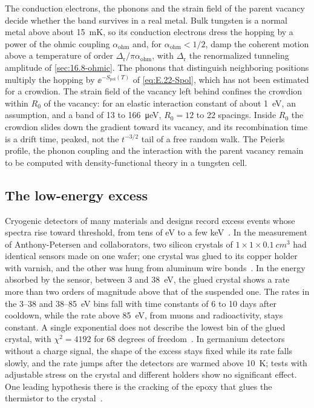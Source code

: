 The conduction electrons, the phonons and the strain field of the parent vacancy decide whether the band survives in a real metal. Bulk tungsten is a normal metal above about \SI{15}{mK}, so its conduction electrons dress the hopping by a power of the ohmic coupling $\alpha_{\mathrm{ohm}}$ and, for $\alpha_{\mathrm{ohm}} < 1/2$, damp the coherent motion above a temperature of order $\Delta_{\mathrm{r}}/\pi\alpha_{\mathrm{ohm}}$, with $\Delta_{\mathrm{r}}$ the renormalized tunneling amplitude of \cref{sec:16.8-ohmic}. The phonons that distinguish neighboring positions multiply the hopping by $\ee^{-S_{\mathrm{pol}}(T)}$ of \cref{eq:E.22-Spol}, which has not been estimated for a crowdion. The strain field of the vacancy left behind confines the crowdion within $R_0$ of the vacancy: for an elastic interaction constant of about \SI{1}{eV}, an assumption, and a band of 13 to \SI{166}{\micro eV}, $R_0 = 12$ to 22 spacings. Inside $R_0$ the crowdion slides down the gradient toward its vacancy, and its recombination time is a drift time, peaked, not the $t^{-3/2}$ tail of a free random walk. The Peierls profile, the phonon coupling and the interaction with the parent vacancy remain to be computed with density-functional theory in a tungsten cell.

\subsection{The low-energy excess}\label{sec:19.6-lee}

Cryogenic detectors of many materials and designs record excess events whose spectra rise toward threshold, from tens of eV to a few keV~\cite{adari2022excess}. In the measurement of Anthony-Petersen and collaborators, two silicon crystals of $1\times1\times\SI{0.1}{cm^3}$ had identical sensors made on one wafer; one crystal was glued to its copper holder with varnish, and the other was hung from aluminum wire bonds~\cite{anthonypetersen2024stress}. In the energy absorbed by the sensor, between 3 and \SI{38}{eV}, the glued crystal shows a rate more than two orders of magnitude above that of the suspended one. The rates in the 3--38 and 38--\SI{85}{eV} bins fall with time constants of 6 to 10 days after cooldown, while the rate above \SI{85}{eV}, from muons and radioactivity, stays constant. A single exponential does not describe the lowest bin of the glued crystal, with $\chi^2 = 4192$ for 68 degrees of freedom~\cite[Sect.~II\,B]{anthonypetersen2024stress}. In germanium detectors without a charge signal, the shape of the excess stays fixed while its rate falls slowly, and the rate jumps after the detectors are warmed above \SI{10}{K}; tests with adjustable stress on the crystal and different holders show no significant effect. One leading hypothesis there is the cracking of the epoxy that glues the thermistor to the crystal~\cite[Sect.~2.1.2]{adari2022excess}.

